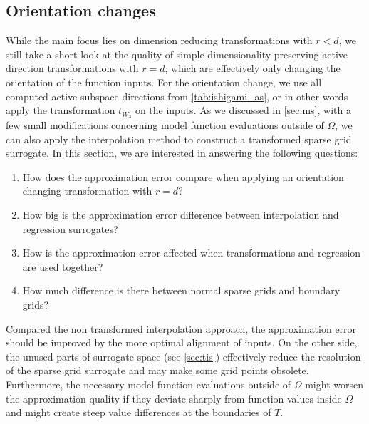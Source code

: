 \documentclass[
  a4paper,  %
  twoside,  %
  bibliography=totoc,
  headsepline,
  cleardoublepage=empty,
  parskip=half,
  draft=false
]{scrbook}
\begin{document}
\subsection{Orientation changes}

While the main focus lies on dimension reducing transformations with $r < d$, we still take a short look at the quality of simple dimensionality preserving active direction transformations with $r=d$, which are effectively only changing the orientation of the function inputs.
For the orientation change, we use all computed active subspace directions from \cref{tab:ishigami_as}, or in other words apply the transformation $t_{W_3}$ on the inputs.
As we discussed in \cref{sec:ms}, with a few small modifications concerning model function evaluations outside of $\Omega$, we can also apply the interpolation method to construct a transformed sparse grid surrogate.
In this section, we are interested in answering the following questions:
\begin{enumerate}
\item How does the approximation error compare when applying an orientation changing transformation with $r=d$?
\item How big is the approximation error difference between interpolation and regression surrogates?
\item How is the approximation error affected when transformations and regression are used together?
\item How much difference is there between normal sparse grids and boundary grids?
\end{enumerate}
%
Compared the non transformed interpolation approach, the approximation error should be improved by the more optimal alignment of inputs.
On the other side, the unused parts of surrogate space (see \cref{sec:tis}) effectively reduce the resolution of the sparse grid surrogate and may make some grid points obsolete.
Furthermore, the necessary model function evaluations outside of $\Omega$ might worsen the approximation quality if they deviate sharply from function values inside $\Omega$ and might create steep value differences at the boundaries of $T$.
\end{document}
